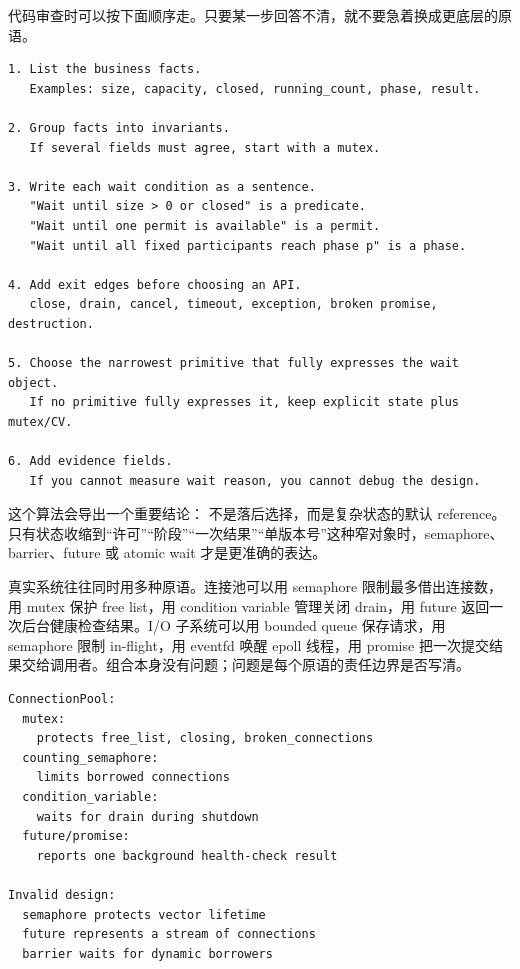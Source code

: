 代码审查时可以按下面顺序走。只要某一步回答不清，就不要急着换成更底层的原语。

\begin{lstlisting}[numbers=none,caption={同步原语选择算法}]
1. List the business facts.
   Examples: size, capacity, closed, running_count, phase, result.

2. Group facts into invariants.
   If several fields must agree, start with a mutex.

3. Write each wait condition as a sentence.
   "Wait until size > 0 or closed" is a predicate.
   "Wait until one permit is available" is a permit.
   "Wait until all fixed participants reach phase p" is a phase.

4. Add exit edges before choosing an API.
   close, drain, cancel, timeout, exception, broken promise, destruction.

5. Choose the narrowest primitive that fully expresses the wait object.
   If no primitive fully expresses it, keep explicit state plus mutex/CV.

6. Add evidence fields.
   If you cannot measure wait reason, you cannot debug the design.
\end{lstlisting}

这个算法会导出一个重要结论： 不是落后选择，而是复杂状态的默认 reference。只有状态收缩到“许可”“阶段”“一次结果”“单版本号”这种窄对象时，semaphore、barrier、future 或 atomic wait 才是更准确的表达。

真实系统往往同时用多种原语。连接池可以用 semaphore 限制最多借出连接数，用 mutex 保护 free list，用 condition variable 管理关闭 drain，用 future 返回一次后台健康检查结果。I/O 子系统可以用 bounded queue 保存请求，用 semaphore 限制 in-flight，用 eventfd 唤醒 epoll 线程，用 promise 把一次提交结果交给调用者。组合本身没有问题；问题是每个原语的责任边界是否写清。

\begin{lstlisting}[numbers=none,caption={一个系统里多个原语的责任分层}]
ConnectionPool:
  mutex:
    protects free_list, closing, broken_connections
  counting_semaphore:
    limits borrowed connections
  condition_variable:
    waits for drain during shutdown
  future/promise:
    reports one background health-check result

Invalid design:
  semaphore protects vector lifetime
  future represents a stream of connections
  barrier waits for dynamic borrowers
\end{lstlisting}

